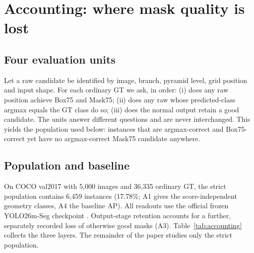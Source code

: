 ﻿\documentclass[times,twocolumn,final,authoryear]{elsarticle}
\begin{document}
\section{Accounting: where mask quality is lost}
\subsection{Four evaluation units}
Let a raw candidate be identified by image, branch, pyramid level, grid position and input shape.
For each ordinary GT we ask, in order: (i) does any raw position achieve Box75 and Mask75; (ii) does
any raw whose predicted-class argmax equals the GT class do so; (iii) does the normal output
retain a good candidate. The units answer different questions and are never interchanged. This
yields the population used below: instances that are argmax-correct and Box75-correct yet have no
argmax-correct Mask75 candidate anywhere.

\subsection{Population and baseline}
On COCO val2017 \citep{lin2014coco} with 5{,}000 images and 36{,}335 ordinary GT, the strict
population contains 6{,}459 instances (17.78\%; A1 gives the score-independent geometry
classes, A4 the baseline AP). All readouts use the official frozen YOLO26m-Seg checkpoint
\citep{jocher2026yolo26}. Output-stage retention accounts for a further, separately recorded loss of
otherwise good masks (A3). Table~\ref{tab:accounting} collects the three layers. The remainder of
the paper studies only the strict population.
\end{document}
